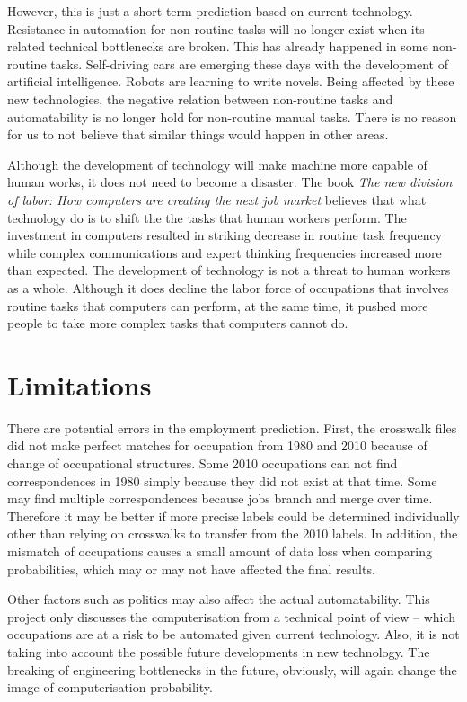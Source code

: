 \documentclass[11pt]{report}
\numberwithin{equation}{chapter}
\begin{document}
\begin{spacing}{2}
However, this is just a short term prediction based on current technology. Resistance in automation for non-routine tasks will no longer exist when its related technical bottlenecks are broken.  This has already happened in some non-routine tasks. Self-driving cars are emerging these days with the development of artificial intelligence. Robots are learning to write novels. Being affected by these new technologies, the negative relation between non-routine tasks and automatability is no longer hold for non-routine manual tasks. There is no reason for us to not believe that similar things would happen in other areas. 

Although the development of technology will make machine more capable of human works, it does not need to become a disaster. The book \textit{The new division of labor: How computers are creating the next job market}\cite{levy2012new} believes that what technology do is to shift the the tasks that human workers perform. The investment in computers resulted in striking decrease in routine task frequency while complex communications and expert thinking frequencies increased more than expected. The development of technology is not a threat to human workers as a whole. Although it does decline the labor force of occupations that involves routine tasks that computers can perform, at the same time, it pushed more people to take more complex tasks that computers cannot do. 



\section{Limitations}
There are potential errors in the employment prediction. First, the crosswalk files did not make perfect matches for occupation from 1980 and 2010 because of change of occupational structures. Some 2010 occupations can not find correspondences in 1980 simply because they did not exist at that time. Some may find multiple correspondences because jobs branch and merge over time. Therefore it may be better if more precise labels could be determined individually other than relying on crosswalks to transfer from the 2010 labels. In addition, the mismatch of occupations causes a small amount of data loss when comparing probabilities, which may or may not have affected the final results.  

Other factors such as politics may also affect the actual automatability. This project only discusses the computerisation from a technical point of view -- which occupations are at a risk to be automated given current technology. Also, it is not taking into account the possible future developments in new technology. The breaking of engineering bottlenecks in the future, obviously, will again change the image of computerisation probability. 




\end{spacing}
\end{document}
